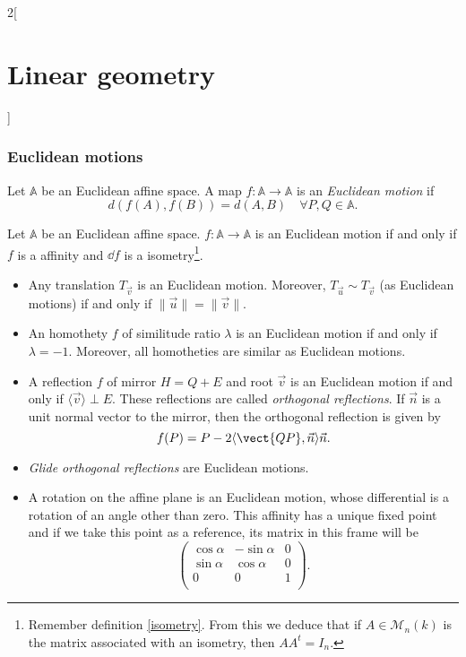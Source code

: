 \documentclass[../../../main.tex]{subfiles}
\begin{document}
\begin{multicols}{2}[\section{Linear geometry}]
\subsubsection*{Euclidean motions}
\label{LG-euclidean_motion}
\begin{definition}
Let $\mathbb{A}$ be an Euclidean affine space. A map $f:\mathbb{A}\rightarrow\mathbb{A}$ is an \textit{Euclidean motion} if $$d(f(A),f(B))=d(A,B)\quad\forall P,Q\in\mathbb{A}.$$
\end{definition}
\begin{prop}
Let $\mathbb{A}$ be an Euclidean affine space. $f:\mathbb{A}\rightarrow\mathbb{A}$ is an Euclidean motion if and only if $f$ is a affinity and $\dd f$ is a isometry\footnote{Remember definition \ref{isometry}. From this we deduce that if $A\in\mathcal{M}_n(k)$ is the matrix associated with an isometry, then $AA^t=I_n$.}.
\end{prop}
\begin{prop}
\hfill
\begin{itemize}
    \item Any translation $T_{\vec{v}}$ is an Euclidean motion. Moreover, $T_{\vec{u}}\sim T_{\vec{v}}$ (as Euclidean motions) if and only if $\|\vec{u}\|=\|\vec{v}\|.$
    \item An homothety $f$ of similitude ratio $\lambda$ is an Euclidean motion if and only if $\lambda=-1$. Moreover, all homotheties are similar as Euclidean motions.
    \item A reflection $f$ of mirror $H=Q+E$ and root $\vec{v}$ is an Euclidean motion if and only if $\langle\vec{v}\rangle\perp E$. These reflections are called \textit{orthogonal reflections}. If $\vec{n}$ is a unit normal vector to the mirror, then the orthogonal reflection is given by $$f(P)=P-2\langle\vect{QP},\vec{n}\rangle\vec{n}.$$
    \item \textit{Glide orthogonal reflections} are Euclidean motions.
    \item A rotation on the affine plane is an Euclidean motion, whose differential is a rotation of an angle other than zero. This affinity has a unique fixed point and if we take this point as a reference, its matrix in this frame will be $$\begin{pmatrix}
    \cos\alpha & -\sin\alpha & 0\\
    \sin\alpha & \cos\alpha & 0\\
    0 & 0 & 1\\
    \end{pmatrix}.$$
\end{itemize}
\end{prop}

\end{multicols}
\end{document}
